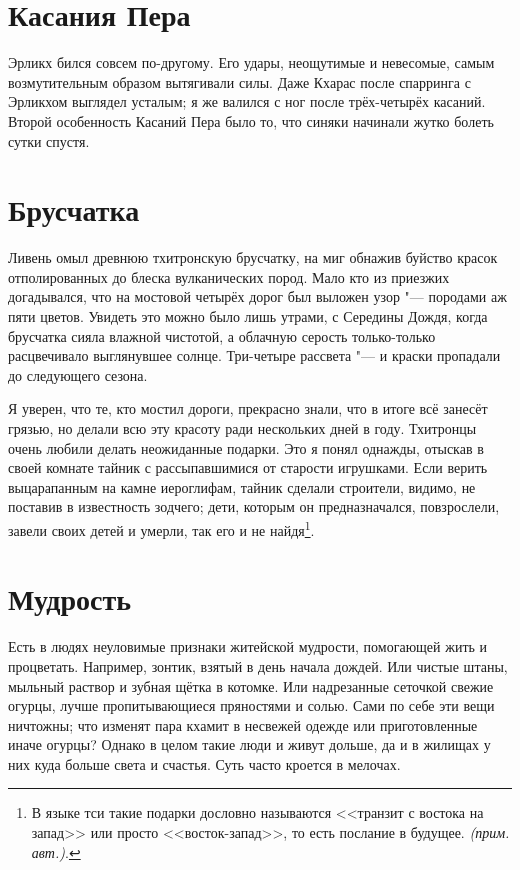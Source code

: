 \documentclass[a4paper,10pt]{book}
\newcommand{\authornote}{\textit{(прим. авт.)}}
\begin{document}
\section{Касания Пера}

 Эрликх бился совсем по-другому. Его удары, неощутимые и невесомые, самым возмутительным образом вытягивали силы. Даже Кхарас после спарринга с Эрликхом выглядел усталым; я же валился с ног после трёх-четырёх касаний. Второй особенность Касаний Пера было то, что синяки начинали жутко болеть сутки спустя.

 
 \section{Брусчатка}

Ливень омыл древнюю тхитронскую брусчатку, на миг обнажив буйство красок отполированных 
до блеска вулканических пород. Мало кто из приезжих догадывался, что на мостовой 
четырёх дорог был выложен узор "--- породами аж пяти цветов. Увидеть это 
можно было лишь утрами, с Середины Дождя, когда брусчатка сияла влажной 
чистотой, а облачную серость только-только расцвечивало выглянувшее солнце. Три-четыре 
рассвета "--- и краски пропадали до следующего сезона.

Я уверен, что те, кто мостил дороги, прекрасно знали, что в итоге всё занесёт грязью, но делали всю эту красоту ради нескольких дней в году. Тхитронцы очень любили делать неожиданные подарки. Это я понял однажды, отыскав в своей комнате  тайник с рассыпавшимися от старости игрушками. Если верить выцарапанным на камне иероглифам, тайник сделали строители, видимо, не поставив в известность зодчего; дети, которым он предназначался, повзрослели, завели своих детей и умерли, так его и не найдя\footnote{В языке тси такие подарки дословно называются <<транзит с востока на запад>> или просто <<восток-запад>>, то есть послание в будущее. \authornote.}.
  
\section{Мудрость}

 Есть в людях неуловимые признаки житейской мудрости, помогающей жить и 
процветать. Например, зонтик, взятый в день начала дождей. Или чистые штаны, 
мыльный раствор и зубная щётка в котомке. Или надрезанные сеточкой свежие 
огурцы, лучше пропитывающиеся пряностями и солью. Сами по себе эти вещи 
ничтожны; что изменят пара кхамит в несвежей одежде или приготовленные иначе 
огурцы? Однако в целом такие люди и живут дольше, да и в жилищах у них куда 
больше света и счастья. Суть часто кроется в мелочах.
\end{document}
